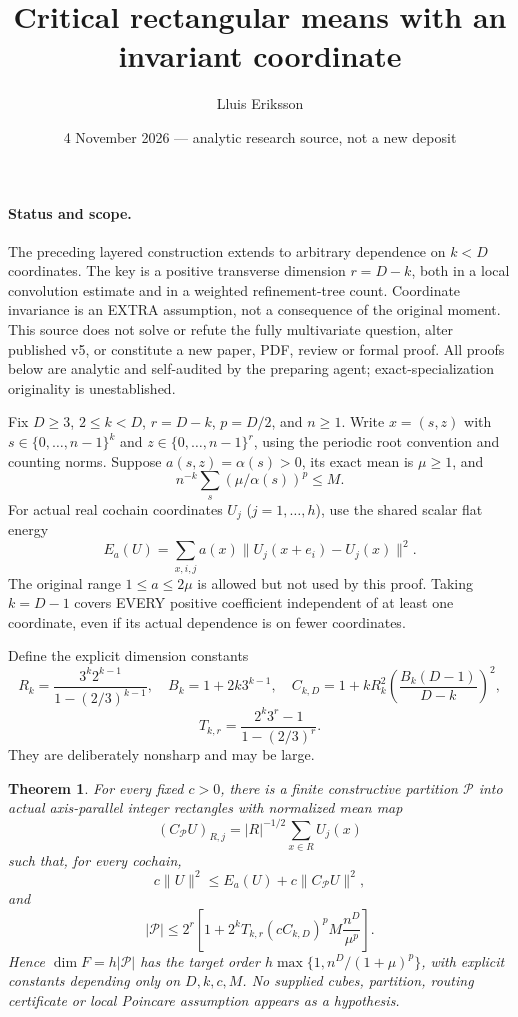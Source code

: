 \documentclass[11pt]{article}
\title{Critical rectangular means with an invariant coordinate}
\author{Lluis Eriksson}
\date{4 November 2026 --- analytic research source, not a new deposit}
\newtheorem{theorem}{Theorem}
\begin{document}
\maketitle
\paragraph{Status and scope.}
The preceding layered construction extends to arbitrary dependence on $k<D$ coordinates. The key is a positive transverse dimension $r=D-k$, both in a local convolution estimate and in a weighted refinement-tree count. Coordinate invariance is an EXTRA assumption, not a consequence of the original moment. This source does not solve or refute the fully multivariate question, alter published v5, or constitute a new paper, PDF, review or formal proof. All proofs below are analytic and self-audited by the preparing agent; exact-specialization originality is unestablished.

Fix $D\ge3$, $2\le k<D$, $r=D-k$, $p=D/2$, and $n\ge1$. Write $x=(s,z)$ with $s\in\{0,\ldots,n-1\}^k$ and $z\in\{0,\ldots,n-1\}^r$, using the periodic root convention and counting norms. Suppose $a(s,z)=\alpha(s)>0$, its exact mean is $\mu\ge1$, and
\[
 n^{-k}\sum_s(\mu/\alpha(s))^p\le M.
\]
For actual real cochain coordinates $U_j$ ($j=1,\ldots,h$), use the shared scalar flat energy
\[
 E_a(U)=\sum_{x,i,j}a(x)\|U_j(x+e_i)-U_j(x)\|^2.
\]
The original range $1\le a\le2\mu$ is allowed but not used by this proof. Taking $k=D-1$ covers EVERY positive coefficient independent of at least one coordinate, even if its actual dependence is on fewer coordinates.

Define the explicit dimension constants
\[
 R_k=\frac{3^k2^{k-1}}{1-(2/3)^{k-1}},\quad
 B_k=1+2k3^{k-1},\quad
 C_{k,D}=1+kR_k^2\left(\frac{B_k(D-1)}{D-k}\right)^2,
\]
\[
 T_{k,r}=\frac{2^k3^r-1}{1-(2/3)^r}.
\]
They are deliberately nonsharp and may be large.
\begin{theorem}\label{thm:main}
For every fixed $c>0$, there is a finite constructive partition $\mathcal P$ into actual axis-parallel integer rectangles with normalized mean map
\[
 (C_{\mathcal P}U)_{R,j}=|R|^{-1/2}\sum_{x\in R}U_j(x)
\]
such that, for every cochain,
\[
 c\|U\|^2\le E_a(U)+c\|C_{\mathcal P}U\|^2,
\]
and
\[
 |\mathcal P|\le 2^r\left[1+2^kT_{k,r}(cC_{k,D})^pM\frac{n^D}{\mu^p}\right].
\]
Hence $\dim F=h|\mathcal P|$ has the target order
$h\max\{1,n^D/(1+\mu)^p\}$, with explicit constants depending only on $D,k,c,M$. No supplied cubes, partition, routing certificate or local Poincare assumption appears as a hypothesis.
\end{theorem}
\end{document}
